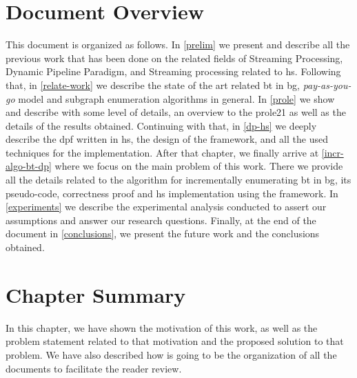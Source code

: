 \section{Document Overview}
This document is organized as follows. In \autoref{prelim} we present and describe all the previous work that has been done on the related fields of Streaming Processing, Dynamic Pipeline Paradigm, and Streaming processing related to \acrshort{hs}. 
Following that, in \autoref{relate-work} we describe the state of the art related \acrshort{bt} in \acrshort{bg}, \emph{pay-as-you-go} model and subgraph enumeration algorithms in general.
In \autoref{prole} we show and describe with some level of details, an overview to the \acrshort{prole21} as well as the details of the results obtained. 
Continuing with that, in \autoref{dp-hs} we deeply describe the \acrshort{dpf} written in \acrshort{hs}, the design of the framework, and all the used techniques for the implementation.
After that chapter, we finally arrive at \autoref{incr-algo-bt-dp} where we focus on the main problem of this work. There we provide all the details related to the algorithm for incrementally enumerating \acrshort{bt} in \acrshort{bg}, its pseudo-code,
correctness proof and \acrshort{hs} implementation using the framework.
In \autoref{experiments} we describe the experimental analysis conducted to assert our assumptions and answer our research questions.
Finally, at the end of the document in \autoref{conclusions}, we present the future work and the conclusions obtained.

\section{Chapter Summary}
In this chapter, we have shown the motivation of this work, as well as the problem statement related to that motivation and the proposed solution to that problem.
We have also described how is going to be the organization of all the documents to facilitate the reader review.
